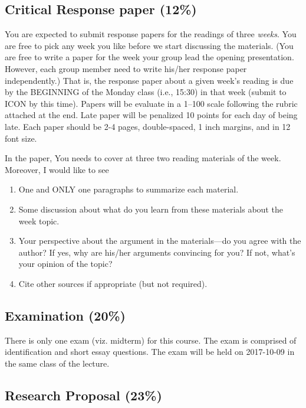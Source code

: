 \documentclass[11pt,]{article}
\providecommand{\tightlist}{%
  \setlength{\itemsep}{0pt}\setlength{\parskip}{0pt}}
\theoremstyle{definition}
\theoremstyle{definition}
\theoremstyle{remark}
\begin{document}
\subsection{Critical Response paper
(12\%)}\label{critical-response-paper-12}

You are expected to submit response papers for the readings of three
\emph{weeks}. You are free to pick any week you like before we start
discussing the materials. (You are free to write a paper for the week
your group lead the opening presentation. However, each group member
need to write his/her response paper independently.) That is, the
response paper about a given week's reading is due by the BEGINNING of
the Monday class (i.e., 15:30) in that week (submit to ICON by this
time). Papers will be evaluate in a 1--100 scale following the rubric
attached at the end. Late paper will be penalized 10 points for each day
of being late. Each paper should be 2-4 pages, double-spaced, 1 inch
margins, and in 12 font size.

In the paper, You needs to cover at three two reading materials of the
week. Moreover, I would like to see

\begin{enumerate}
\def\labelenumi{\arabic{enumi}.}
\tightlist
\item
  One and ONLY one paragraphs to summarize each material.
\item
  Some discussion about what do you learn from these materials about the
  week topic.
\item
  Your perspective about the argument in the materials---do you agree
  with the author? If yes, why are his/her arguments convincing for you?
  If not, what's your opinion of the topic?
\item
  Cite other sources if appropriate (but not required).
\end{enumerate}

\subsection{Examination (20\%)}\label{examination-20}

There is only one exam (viz. midterm) for this course. The exam is
comprised of identification and short essay questions. The exam will be
held on 2017-10-09 in the same class of the lecture.

\subsection{Research Proposal (23\%)}\label{research-proposal-23}
\end{document}
